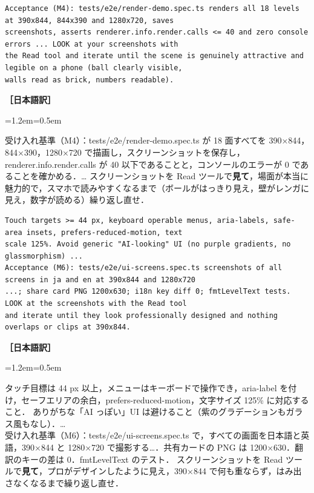 \documentclass[a4paper,10pt]{ltjsarticle}
\newenvironment{yaku}{\par\vspace{-2pt}\small\noindent\textbf{［日本語訳］}\par\nopagebreak\begin{list}{}{\leftmargin=1.2em\rightmargin=0.5em\topsep=1pt}\item\relax}{\end{list}\vspace{4pt}}
\begin{document}
\begin{lstlisting}[caption={描画担当への受け入れ基準（抜粋）}]
Acceptance (M4): tests/e2e/render-demo.spec.ts renders all 18 levels at 390x844, 844x390 and 1280x720, saves
screenshots, asserts renderer.info.render.calls <= 40 and zero console errors ... LOOK at your screenshots with
the Read tool and iterate until the scene is genuinely attractive and legible on a phone (ball clearly visible,
walls read as brick, numbers readable).
\end{lstlisting}
\begin{yaku}
受け入れ基準（M4）：tests/e2e/render-demo.spec.ts が 18 面すべてを 390×844，844×390，1280×720 で描画し，スクリーンショットを保存し，
renderer.info.render.calls が 40 以下であることと，コンソールのエラーが 0 であることを確かめる．…
スクリーンショットを Read ツールで\textbf{見て}，場面が本当に魅力的で，スマホで読みやすくなるまで（ボールがはっきり見え，壁がレンガに見え，数字が読める）繰り返し直せ．
\end{yaku}

\begin{lstlisting}[caption={UI 担当への受け入れ基準（抜粋）}]
Touch targets >= 44 px, keyboard operable menus, aria-labels, safe-area insets, prefers-reduced-motion, text
scale 125%. Avoid generic "AI-looking" UI (no purple gradients, no glassmorphism) ...
Acceptance (M6): tests/e2e/ui-screens.spec.ts screenshots of all screens in ja and en at 390x844 and 1280x720
...; share card PNG 1200x630; i18n key diff 0; fmtLevelText tests. LOOK at the screenshots with the Read tool
and iterate until they look professionally designed and nothing overlaps or clips at 390x844.
\end{lstlisting}
\begin{yaku}
タッチ目標は 44 px 以上，メニューはキーボードで操作でき，aria-label を付け，セーフエリアの余白，prefers-reduced-motion，文字サイズ 125\% に対応すること．
ありがちな「AI っぽい」UI は避けること（紫のグラデーションもガラス風もなし）．…\\
受け入れ基準（M6）：tests/e2e/ui-screens.spec.ts で，すべての画面を日本語と英語，390×844 と 1280×720 で撮影する…．共有カードの PNG は 1200×630．翻訳のキーの差は 0．fmtLevelText のテスト．
スクリーンショットを Read ツールで\textbf{見て}，プロがデザインしたように見え，390×844 で何も重ならず，はみ出さなくなるまで繰り返し直せ．
\end{yaku}
\end{document}
